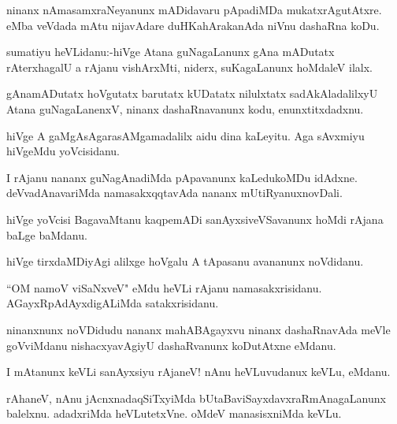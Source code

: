 \documentclass{article}
\begin{document}
\begin{mn}%
ninanx nAmasamxraNeyanunx mADidavaru pApadiMDa mukatxrAgutAtxre. eMba veVdada mAtu 
nijavAdare duHKahArakanAda niVnu dashaRna koDu.
\end{mn}

\begin{mn}%
sumatiyu heVLidanu:-hiVge Atana guNagaLanunx gAna mADutatx rAterxhagalU a rAjanu 
vishArxMti, niderx, suKagaLanunx hoMdaleV ilalx. 
\end{mn}

\begin{mn}%
gAnamADutatx hoVgutatx barutatx kUDatatx nilulxtatx sadAkAladalilxyU Atana guNagaLanenxV, 
ninanx dashaRnavanunx kodu, enunxtitxdadxnu.
\end{mn}

\begin{mn}%
hiVge A gaMgAsAgarasAMgamadalilx aidu dina kaLeyitu. Aga sAvxmiyu hiVgeMdu yoVcisidanu.
\end{mn}

\begin{mn}%
I rAjanu nananx guNagAnadiMda pApavanunx kaLedukoMDu idAdxne. deVvadAnavariMda 
namasakxqqtavAda nananx mUtiRyanuxnovDali.
\end{mn}

\begin{mn}%
hiVge yoVcisi BagavaMtanu kaqpemADi sanAyxsiveVSavanunx hoMdi rAjana baLge baMdanu.
\end{mn}

\begin{mn}%
hiVge tirxdaMDiyAgi alilxge hoVgalu A tApasanu avananunx noVdidanu.
\end{mn}

\begin{mn}%
``OM namoV viSaNxveV" eMdu heVLi rAjanu namasakxrisidanu. AGayxRpAdAyxdigALiMda 
satakxrisidanu.
\end{mn}

\begin{mn}%
ninanxnunx noVDidudu nananx mahABAgayxvu ninanx dashaRnavAda meVle goVviMdanu 
nishacxyavAgiyU dashaRvanunx koDutAtxne eMdanu.
\end{mn}

\begin{mn}%
I mAtanunx keVLi sanAyxsiyu rAjaneV! nAnu heVLuvudanux keVLu, eMdanu.
\end{mn}

\begin{mn}%
rAhaneV, nAnu jAcnxnadaqSiTxyiMda bUtaBaviSayxdavxraRmAnagaLanunx balelxnu. adadxriMda 
heVLutetxVne. oMdeV manasisxniMda keVLu.
\end{mn}
\end{document}
